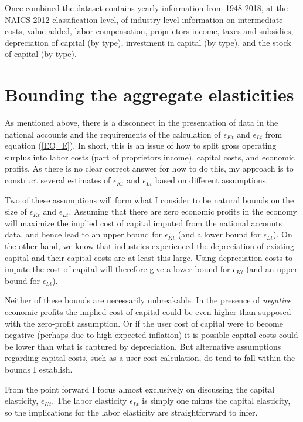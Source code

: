 \documentclass[11pt]{article}
\begin{document}
Once combined the dataset contains yearly information from 1948-2018, at the NAICS 2012 classification level, of industry-level information on intermediate costs, value-added, labor compensation, proprietors income, taxes and subsidies, depreciation of capital (by type), investment in capital (by type), and the stock of capital (by type).

\section{Bounding the aggregate elasticities}
As mentioned above, there is a disconnect in the presentation of data in the national accounts and the requirements of the calculation of $\epsilon_{Kt}$ and $\epsilon_{Lt}$ from equation (\ref{EQ_E}). In short, this is an issue of how to split gross operating surplus into labor costs (part of proprietors income), capital costs, and economic profits. As there is no clear correct answer for how to do this, my approach is to construct several estimates of $\epsilon_{Kt}$ and $\epsilon_{Lt}$ based on different assumptions.

Two of these assumptions will form what I consider to be natural bounds on the size of $\epsilon_{Kt}$ and $\epsilon_{Lt}$. Assuming that there are zero economic profits in the economy will maximize the implied cost of capital imputed from the national accounts data, and hence lead to an upper bound for $\epsilon_{Kt}$ (and a lower bound for $\epsilon_{Lt}$). On the other hand, we know that industries experienced the depreciation of existing capital and their capital costs are at least this large. Using depreciation costs to impute the cost of capital will therefore give a lower bound for $\epsilon_{Kt}$ (and an upper bound for $\epsilon_{Lt}$). 

Neither of these bounds are necessarily unbreakable. In the presence of \textit{negative} economic profits the implied cost of capital could be even higher than supposed with the zero-profit assumption. Or if the user cost of capital were to become negative (perhaps due to high expected inflation) it is possible capital costs could be lower than what is captured by depreciation. But alternative assumptions regarding capital costs, such as a user cost calculation, do tend to fall within the bounds I establish.

From the point forward I focus almost exclusively on discussing the capital elasticity, $\epsilon_{Kt}$. The labor elasticity $\epsilon_{Lt}$ is simply one minus the capital elasticity, so the implications for the labor elasticity are straightforward to infer. 
\end{document}
